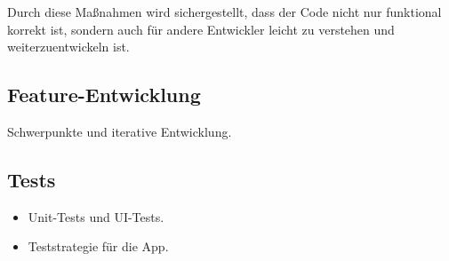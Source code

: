 Durch diese Maßnahmen wird sichergestellt, dass der Code nicht nur funktional korrekt ist, sondern auch für andere Entwickler leicht zu verstehen und weiterzuentwickeln ist.

\subsection{Feature-Entwicklung}
Schwerpunkte und iterative Entwicklung.

\subsection{Tests}
\begin{itemize}
    \item Unit-Tests und UI-Tests.
    \item Teststrategie für die App.
\end{itemize}
